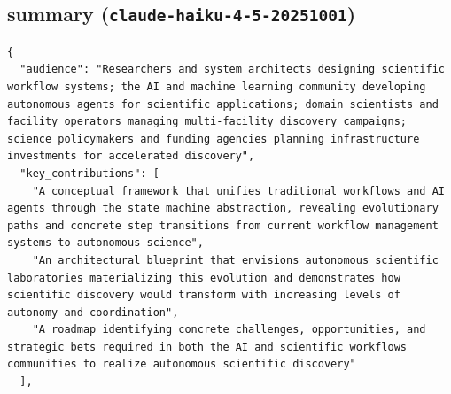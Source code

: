 \documentclass[11pt]{article}
\begin{document}
\subsection*{summary (\texttt{claude-haiku-4-5-20251001})}
\begin{verbatim}
{
  "audience": "Researchers and system architects designing scientific workflow systems; the AI and machine learning community developing autonomous agents for scientific applications; domain scientists and facility operators managing multi-facility discovery campaigns; science policymakers and funding agencies planning infrastructure investments for accelerated discovery",
  "key_contributions": [
    "A conceptual framework that unifies traditional workflows and AI agents through the state machine abstraction, revealing evolutionary paths and concrete step transitions from current workflow management systems to autonomous science",
    "An architectural blueprint that envisions autonomous scientific laboratories materializing this evolution and demonstrates how scientific discovery would transform with increasing levels of autonomy and coordination",
    "A roadmap identifying concrete challenges, opportunities, and strategic bets required in both the AI and scientific workflows communities to realize autonomous scientific discovery"
  ],

\end{verbatim}
\end{document}
